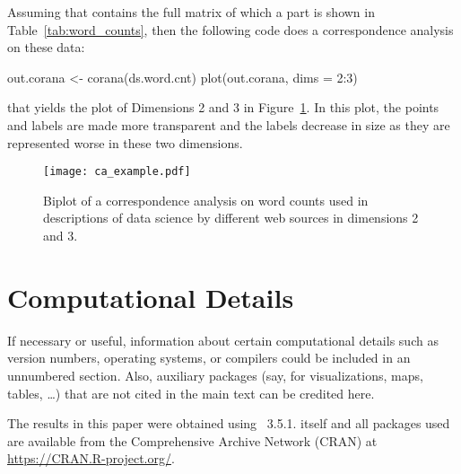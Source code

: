 \documentclass[article]{jdssv}
\begin{document}
Assuming that  contains the full matrix of which a part is shown in Table~\ref*{tab:word_counts}, then the following code does a correspondence analysis on these data:
\begin{Code}
out.corana <- corana(ds.word.cnt)
plot(out.corana, dims = 2:3)
\end{Code}
that yields the plot of Dimensions 2 and 3 in Figure~\ref{fig:ca_biplot_dims23}. In this plot, the points and labels are made more transparent and the labels decrease in size as they are represented worse in these two dimensions.

\begin{figure}
\begin{center}
\texttt{[image: ca\_example.pdf]}
\end{center}
\caption{Biplot of a correspondence analysis on word counts used in descriptions of data science by different web sources in dimensions 2 and 3.} \label{fig:ca_biplot_dims23}
\end{figure}








%


\newpage
\section*{Computational Details}

If necessary or useful, information about certain computational details
such as version numbers, operating systems, or compilers could be included
in an unnumbered section. Also, auxiliary packages (say, for visualizations,
maps, tables, \dots) that are not cited in the main text can be credited here.


The results in this paper were obtained using
~3.5.1.  itself
and all packages used are available from the Comprehensive
 Archive Network (CRAN) at
\url{https://CRAN.R-project.org/}.
\end{document}
